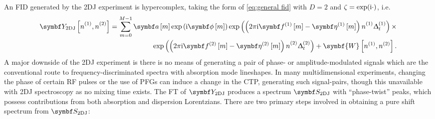 An FID generated by the \ac{2DJ} experiment is hypercomplex, taking the form of
\eqref{eq:general fid} with $D=2$ and $\zeta = \exp(\mathrm{i}\cdot)$, i.e.
\begin{equation}%
    \begin{split}%
        \jresfid\idxnonentwo =
        \sum_{m=0}^{M-1} \bdam \exp\left( \iu \bdphim \right)
            \exp\left(\left(2 \pi \iu \bdfonem - \bdetaonem\right) {\none}_{\vphantom{t}} \Dtone\right) \times \\
            \exp\left(\left(2 \pi \iu \bdftwom - \bdetatwom\right) {\ntwo}_{\vphantom{t}} \Dttwo\right)
            + \symbf{W}\left[n^{(1)}, n^{(2)}\right].
    \end{split}%
    \label{eq:jres-fid}
\end{equation}%
A major downside of the \ac{2DJ} experiment is there is no means of generating
a pair of phase- or amplitude-modulated signals which are the
conventional route to frequency-discriminated spectra with absorption mode
lineshapes. In many multidimensional experiments, changing the phase of
certain \ac{RF} pulses or the use of \acp{PFG} can induce a change in the \ac{CTP},
generating such signal-pairs, though this unavailable with \ac{2DJ}
spectroscopy as no mixing time exists. The FT of $\jresfid$ produces a spectrum
$\jresspec$ with ``phase-twist'' peaks, which possess contributions from both absorption
and dispersion Lorentzians. There are two primary steps involved in obtaining a
pure shift spectrum from $\jresspec$:

